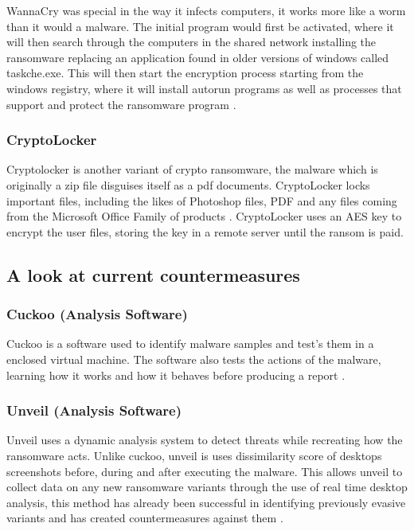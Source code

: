 \documentclass[progress]{cmpreport}
\begin{document}
			WannaCry was special in the way it infects computers, it works more like a worm than it would a malware. The initial program would first be activated, where it will then search through the computers in the shared network installing the ransomware replacing an application found in older versions of windows called taskche.exe. This will then start the encryption process starting from the windows registry, where it will install autorun programs as well as processes that support and protect the ransomware program \citep{8323682}.
			
			\subsubsection{CryptoLocker}
			Cryptolocker is another variant of crypto ransomware, the malware which is originally a zip file disguises itself as a pdf documents. CryptoLocker locks important files, including the likes of Photoshop files, PDF and any files coming from the Microsoft Office Family of products \citep{AshleyHansberry}. CryptoLocker uses an AES key to encrypt the user files, storing the key in a remote server until the ransom is paid.
			
		\subsection{A look at current countermeasures}
			\subsubsection{Cuckoo (Analysis Software)}
			Cuckoo is a software used to identify malware samples and test's them in a enclosed virtual machine. The software also tests the actions of the malware, learning how it works and how it behaves before producing a report \citep{8260673}.
			
			\subsubsection{Unveil (Analysis Software)}
			Unveil uses a dynamic analysis system to detect threats while recreating how the ransomware acts. Unlike cuckoo, unveil is uses dissimilarity score of desktops screenshots before, during and after executing the malware. This allows unveil to collect data on any new ransomware variants through the use of real time desktop analysis, this method has already been successful in identifying previously evasive variants and has created countermeasures against them \citep{8260673}.
			
\end{document}
